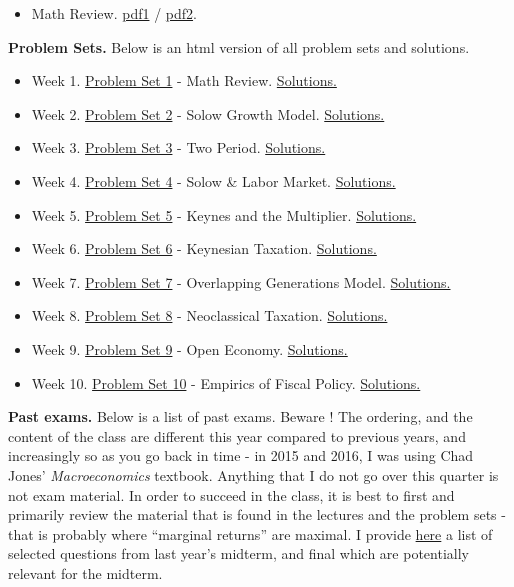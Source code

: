 \documentclass[]{book}
\providecommand{\tightlist}{%
  \setlength{\itemsep}{0pt}\setlength{\parskip}{0pt}}
\theoremstyle{definition}
\theoremstyle{definition}
\theoremstyle{definition}
\theoremstyle{remark}
\begin{document}
\begin{itemize}
\tightlist
\item
  Math Review. \href{old/calculus-review.pdf}{pdf1} /
  \href{old/calculus-review2.pdf}{pdf2}.
\end{itemize}

\textbf{Problem Sets.} Below is an html version of all problem sets and
solutions.

\begin{itemize}
\tightlist
\item
  Week 1. \protect\hyperlink{pset1}{Problem Set 1} - Math Review.
  \protect\hyperlink{pset1-sol}{Solutions.}
\item
  Week 2. \protect\hyperlink{pset2}{Problem Set 2} - Solow Growth Model.
  \protect\hyperlink{pset2-sol}{Solutions.}
\item
  Week 3. \protect\hyperlink{pset3}{Problem Set 3} - Two Period.
  \protect\hyperlink{pset3-sol}{Solutions.}
\item
  Week 4. \protect\hyperlink{pset4}{Problem Set 4} - Solow \& Labor
  Market. \protect\hyperlink{pset4-sol}{Solutions.}
\item
  Week 5. \protect\hyperlink{pset5}{Problem Set 5} - Keynes and the
  Multiplier. \protect\hyperlink{pset5-sol}{Solutions.}
\item
  Week 6. \protect\hyperlink{pset6}{Problem Set 6} - Keynesian Taxation.
  \protect\hyperlink{pset6-sol}{Solutions.}
\item
  Week 7. \protect\hyperlink{pset7}{Problem Set 7} - Overlapping
  Generations Model. \protect\hyperlink{pset7-sol}{Solutions.}
\item
  Week 8. \protect\hyperlink{pset8}{Problem Set 8} - Neoclassical
  Taxation. \protect\hyperlink{pset8-sol}{Solutions.}
\item
  Week 9. \protect\hyperlink{pset9}{Problem Set 9} - Open Economy.
  \protect\hyperlink{pset9-sol}{Solutions.}
\item
  Week 10. \protect\hyperlink{pset10}{Problem Set 10} - Empirics of
  Fiscal Policy. \protect\hyperlink{pset10-sol}{Solutions.}
\end{itemize}

\textbf{Past exams.} Below is a list of past exams. Beware ! The
ordering, and the content of the class are different this year compared
to previous years, and increasingly so as you go back in time - in 2015
and 2016, I was using Chad Jones' \emph{Macroeconomics} textbook.
Anything that I do not go over this quarter is not exam material. In
order to succeed in the class, it is best to first and primarily review
the material that is found in the lectures and the problem sets - that
is probably where ``marginal returns'' are maximal. I provide
\href{past-exams.html}{here} a list of selected questions from last
year's midterm, and final which are potentially relevant for the
midterm.
\end{document}
